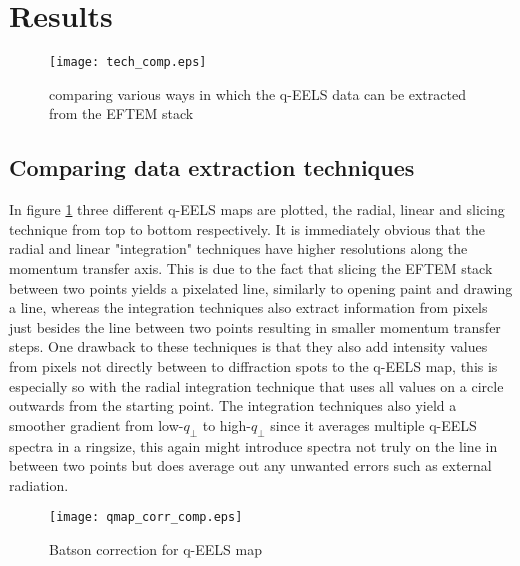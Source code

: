 \section{Results}
\label{chap:results}
\begin{figure}[h!]
	\centering
	\texttt{[image: tech\_comp.eps]}
	\caption{comparing various ways in which the q-EELS data can be extracted from the EFTEM stack}
	\label{fig:tech-comp}
\end{figure}%
%
\subsection{Comparing data extraction techniques}
In figure \ref{fig:tech-comp} three different q-EELS maps are plotted, the radial, linear and slicing technique from top to bottom respectively. It is immediately obvious that the radial and linear "integration" techniques have higher resolutions along the momentum transfer axis. This is due to the fact that slicing the EFTEM stack between two points yields a pixelated line, similarly to opening paint and drawing a line, whereas the integration techniques also extract information from pixels just besides the line between two points resulting in smaller momentum transfer steps. One drawback to these techniques is that they also add intensity values from pixels not directly between to diffraction spots to the q-EELS map, this is especially so with the radial integration technique that uses all values on a circle outwards from the starting point.
The integration techniques also yield a smoother gradient from low-$q_{\perp}$ to high-$q_{\perp}$ since it averages multiple q-EELS spectra in a ringsize, this again might introduce spectra not truly on the line in between two points but does average out any unwanted errors such as external radiation.\\
\newpage%
%
\begin{figure}[h!]
	\centering
	\texttt{[image: qmap\_corr\_comp.eps]}
	\caption{Batson correction for q-EELS map}
	\label{fig:bat-cor}
\end{figure}
